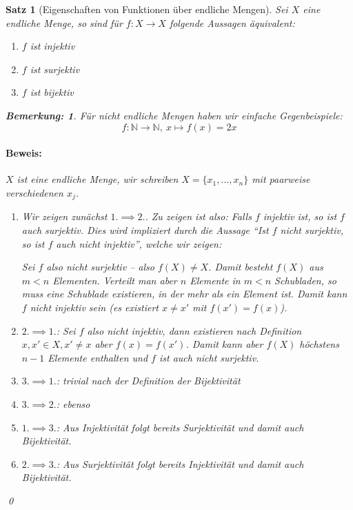 \documentclass{report}
\newcommand{\N}{\mathbb{N}}
\theoremstyle{customrem}
\newtheorem*{bemerkung}{Bemerkung\textnormal:}
\theoremstyle{customdef}
\newtheorem{satz}[definition]{Satz}
\renewenvironment{proof}{\paragraph{Beweis: }}{\qed}
\theoremstyle{customenv}
\begin{document}
	\begin{satz}[Eigenschaften von Funktionen über endliche Mengen]
		Sei \(X\) eine endliche Menge, so sind für \(f : X \to X\) folgende Aussagen äquivalent:
		\begin{enumerate}
			\itemsep0cm
			\item \(f\) ist injektiv 
			\item \(f\) ist surjektiv
			\item \(f\) ist bijektiv
		\end{enumerate}
		
		\begin{bemerkung}
			Für nicht endliche Mengen haben wir einfache Gegenbeispiele:
			\[f : \N \to \N,\ x \mapsto f(x) = 2x\]
		\end{bemerkung}
		
		\begin{proof}
			\(X\) ist eine endliche Menge, wir schreiben \(X = \{x_1, \dots, x_n\}\) mit paarweise verschiedenen \(x_j\).
			\begin{enumerate}
				\item[i)] Wir zeigen zunächst \(1. \implies 2.\). Zu zeigen ist also: Falls \(f\) injektiv ist, so ist \(f\) auch surjektiv. Dies wird impliziert durch die Aussage "`Ist \(f\) \textit{nicht} surjektiv, so ist \(f\) auch \textit{nicht} injektiv"', welche wir zeigen:
				
				Sei \(f\) also nicht surjektiv -- also \(f(X) \neq X\). Damit besteht \(f(X)\) aus \(m < n\) Elementen. Verteilt man aber \(n\) Elemente in \(m < n\) Schubladen, so muss eine Schublade existieren, in der mehr als ein Element ist. Damit kann \(f\) nicht injektiv sein (es existiert \(x \neq x'\) mit \(f(x') = f(x)\)).
				\item[ii)] \(2. \implies 1.\): Sei \(f\) also nicht injektiv, dann existieren nach Definition \(x, x' \in X, x' \neq x\) aber \(f(x) = f(x')\). Damit kann aber \(f(X)\) höchstens \(n-1\) Elemente enthalten und \(f\) ist auch nicht surjektiv.
				\item[iii)] \(3. \implies 1.\): trivial nach der Definition der Bijektivität
				\item[iv)] \(3. \implies 2.\): ebenso
				\item[v)] \(1. \implies 3.\): Aus Injektivität folgt bereits Surjektivität und damit auch Bijektivität.
				\item[vi)] \(2. \implies 3.\): Aus Surjektivität folgt bereits Injektivität und damit auch Bijektivität.
			\end{enumerate}
		\end{proof}
	\end{satz}
	
\end{document}
